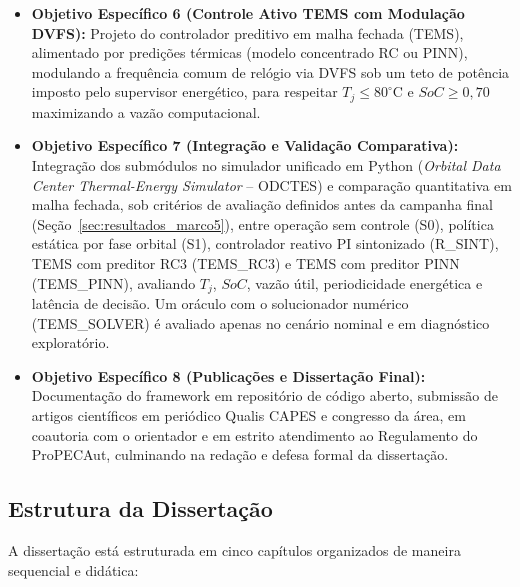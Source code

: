 \begin{itemize}[leftmargin=*]
    \item \textbf{Objetivo Específico 6 (Controle Ativo TEMS com Modulação DVFS):} Projeto do controlador preditivo em malha fechada (TEMS), alimentado por predições térmicas (modelo concentrado RC ou PINN), modulando a frequência comum de relógio via DVFS sob um teto de potência imposto pelo supervisor energético, para respeitar $T_j \le 80^\circ\text{C}$ e $SoC \ge 0{,}70$ maximizando a vazão computacional.
    
    \item \textbf{Objetivo Específico 7 (Integração e Validação Comparativa):} Integração dos submódulos no simulador unificado em Python (\textit{Orbital Data Center Thermal-Energy Simulator} -- ODCTES) e comparação quantitativa em malha fechada, sob critérios de avaliação definidos antes da campanha final (Seção~\ref{sec:resultados_marco5}), entre operação sem controle (S0), política estática por fase orbital (S1), controlador reativo PI sintonizado (R\_SINT), TEMS com preditor RC3 (TEMS\_RC3) e TEMS com preditor PINN (TEMS\_PINN), avaliando $T_j$, $SoC$, vazão útil, periodicidade energética e latência de decisão. Um oráculo com o solucionador numérico (TEMS\_SOLVER) é avaliado apenas no cenário nominal e em diagnóstico exploratório.
    
    \item \textbf{Objetivo Específico 8 (Publicações e Dissertação Final):} Documentação do framework em repositório de código aberto, submissão de artigos científicos em periódico Qualis CAPES e congresso da área, em coautoria com o orientador e em estrito atendimento ao Regulamento do ProPECAut, culminando na redação e defesa formal da dissertação.
\end{itemize}

\subsection{Estrutura da Dissertação}

A dissertação está estruturada em cinco capítulos organizados de maneira sequencial e didática:

